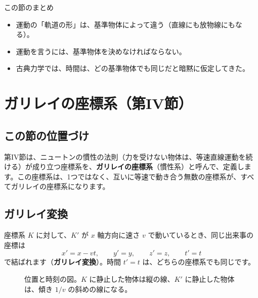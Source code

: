 \documentclass[a4paper,11pt,openany]{ltjsbook}
\begin{document}
\begin{pointbox}{この節のまとめ}
\begin{itemize}[leftmargin=*]
\item 運動の「軌道の形」は、基準物体によって違う（直線にも放物線にもなる）。
\item 運動を言うには、基準物体を決めなければならない。
\item 古典力学では、時間は、どの基準物体でも同じだと暗黙に仮定してきた。
\end{itemize}
\end{pointbox}

\chapter{ガリレイの座標系（第IV節）}

\section{この節の位置づけ}

第IV節は、ニュートンの慣性の法則（力を受けない物体は、等速直線運動を続ける）が成り立つ座標系を、\textbf{ガリレイの座標系}（慣性系）と呼んで、定義します。この座標系は、1つではなく、互いに等速で動き合う無数の座標系が、すべてガリレイの座標系になります。

\section{ガリレイ変換}

座標系 $K$ に対して、$K'$ が $x$ 軸方向に速さ $v$ で動いているとき、同じ出来事の座標は
\[
x'=x-vt,\qquad y'=y,\qquad z'=z,\qquad t'=t
\]
で結ばれます（\textbf{ガリレイ変換}）。時間 $t'=t$ は、どちらの座標系でも同じです。

\begin{figure}[htbp]
\centering
{}
\caption{位置と時刻の図。$K$ に静止した物体は縦の線、$K'$ に静止した物体は、傾き $1/v$ の斜めの線になる。}
\end{figure}
\end{document}
